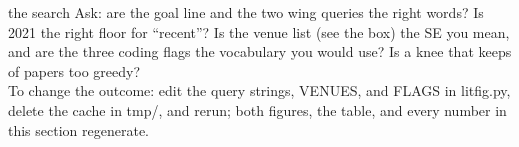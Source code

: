 \newcommand{\bnfleaf}[1]{\par\smallskip\noindent
{\bfseries [#1]}\hspace{0.5em}}



\begin{pause}{the search}
Ask: are the goal line and the two wing queries the right words?
Is 2021 the right floor for ``recent''?
Is the venue list (see the box) the SE you mean, and are the three
coding flags the vocabulary you would use?
Is a knee that keeps \litKnee{} of \litSE{} papers too
greedy?\\[0.2em] To change the outcome: edit the query strings,
{\ttfamily VENUES}, and {\ttfamily FLAGS} in {\ttfamily litfig.py},
delete the cache in {\ttfamily tmp/}, and rerun; both figures, the
table, and every number in this section regenerate.
\end{pause}
